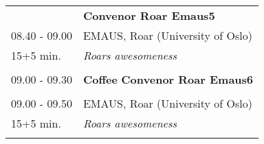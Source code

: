\begin{table}[h!]
\begin{tabular}{p{3cm}p{13cm}}
&\hfill {\bf Convenor Roar Emaus5 }\\ 
08.40 - 09.00 & EMAUS, Roar (University of Oslo)\\ 
15+5 min. & {\it Roars awesomeness}\\ 
 & \\ 
09.00 - 09.30 & {\bf Coffee} \hfill {\bf Convenor Roar Emaus6 }\\ 
 & \\ 
09.00 - 09.50 & EMAUS, Roar (University of Oslo)\\ 
15+5 min. & {\it Roars awesomeness}\\ 
 & \\ 
\end{tabular}
\end{table}

